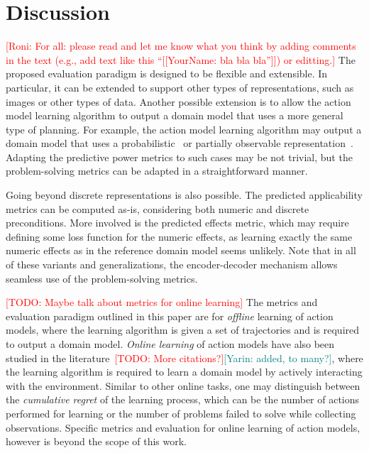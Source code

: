 \documentclass{article}
\theoremstyle{definition}
\theoremstyle{remark}
\newcommand{\todo}[1]{{\textcolor{red}{[TODO: #1]}}}
\newcommand{\roni}[1]{{\textcolor{red}{[Roni: #1]}}}
\newcommand{\yarin}[1]{{\textcolor{teal}{[Yarin: #1]}}}
\begin{document}
\section{Discussion}
\roni{For all: please read and let me know what you think by adding comments in the text (e.g., add text like this ``[[YourName: bla bla bla'']]) or editting.}
The proposed evaluation paradigm is designed to be flexible and extensible. 
In particular, it can be extended to support other types of representations, such as images or other types of data. 
Another possible extension is to allow the action model learning algorithm to output a domain model that uses a more general type of planning. 
For example, the action model learning algorithm may output a domain model that uses a probabilistic~\cite{xi2024neuro} or partially observable representation~\cite{le2024learning}. 
Adapting the predictive power metrics to such cases may be not trivial, but the problem-solving metrics can be adapted in a straightforward manner.


Going beyond discrete representations is also possible. 
The predicted applicability metrics can be computed as-is, considering both numeric and discrete preconditions.
More involved is the predicted effects metric, which may require defining some loss function for the numeric effects, as learning exactly the same numeric effects as in the reference domain model seems unlikely. 
Note that in all of these variants and generalizations, the encoder-decoder mechanism allows seamless use of the problem-solving metrics. 


\todo{Maybe talk about metrics for online learning}
The metrics and evaluation paradigm outlined in this paper are for \emph{offline} learning of action models, where the learning algorithm is given a set of trajectories and is required to output a domain model. \emph{Online learning} of action models have also been studied in the literature~\citep{lamanna2021online, sreedharan2023optimistic, benyamin2025integratingreinforcementlearningaction, ng2019incremental, chitnis2021glib, verma2023autonomous, karia2023epistemic, jin2022creativity}\todo{More citations?}\yarin{added, to many?}, where the learning algorithm is required to learn a domain model by actively interacting with the environment. Similar to other online tasks, one may distinguish between the \emph{cumulative regret} of the learning process, which can be the number of actions performed for learning or the number of problems failed to solve while collecting observations. 
Specific metrics and evaluation for online learning of action models, however is beyond the scope of this work. 
\end{document}
